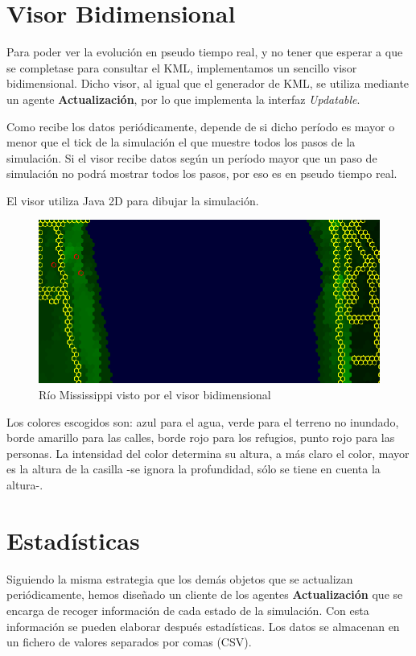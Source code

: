 \section{Visor Bidimensional}

Para poder ver la evolución en pseudo tiempo real, y no tener que esperar a que
se completase para consultar el KML, implementamos un sencillo visor
bidimensional. Dicho visor, al igual que el generador de KML, se utiliza
mediante un agente {\bf Actualización}, por lo que implementa la interfaz {\em
Updatable}.

Como recibe los datos periódicamente, depende de si dicho período es mayor o
menor que el tick de la simulación el que muestre todos los pasos de la
simulación. Si el visor recibe datos según un período mayor que un paso de
simulación no podrá mostrar todos los pasos, por eso es en pseudo tiempo real.

El visor utiliza Java 2D para dibujar la simulación.

\begin{figure}[H]
 \centering
 \includegraphics[width=120mm]{figuras/cap5/visor.png}
 \caption{Río Mississippi visto por el visor bidimensional}
\end{figure}

Los colores escogidos son: azul para el agua, verde para el terreno no
inundado, borde amarillo para las calles, borde rojo para los refugios, punto
rojo para las personas. La intensidad del color determina su altura, a más
claro el color, mayor es la altura de la casilla -se ignora la profundidad,
sólo se tiene en cuenta la altura-.

\section{Estadísticas}

Siguiendo la misma estrategia que los demás objetos que se actualizan
periódicamente, hemos diseñado un cliente de los agentes {\bf Actualización} que
se encarga de recoger información de cada estado de la simulación. Con esta
información se pueden elaborar después estadísticas. Los datos se almacenan en
un fichero de valores separados por comas (CSV).

